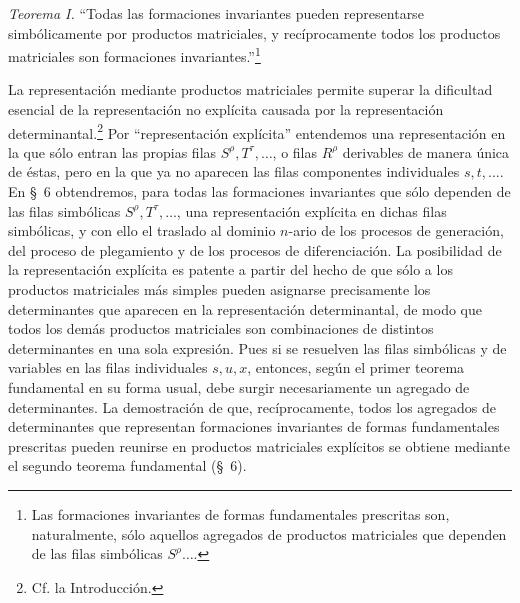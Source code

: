 \documentclass[11pt]{article}
\begin{document}
\emph{Teorema I.} ``Todas las formaciones invariantes pueden representarse simbólicamente por productos matriciales, y recíprocamente todos los productos matriciales son formaciones invariantes.''\footnote{Las formaciones invariantes de formas fundamentales prescritas son, naturalmente, sólo aquellos agregados de productos matriciales que dependen de las filas simbólicas $S^\rho\ldots$.}

La representación mediante productos matriciales permite superar la dificultad esencial de la representación no explícita causada por la representación determinantal.\footnote{Cf. la Introducción.} Por ``representación explícita'' entendemos una representación en la que sólo entran las propias filas $S^\rho,T^\tau,\ldots$, o filas $R^\rho$ derivables de manera única de éstas, pero en la que ya no aparecen las filas componentes individuales $s,t,\ldots$. En \S\ 6 obtendremos, para todas las formaciones invariantes que sólo dependen de las filas simbólicas $S^\rho,T^\tau,\ldots$, una representación explícita en dichas filas simbólicas, y con ello el traslado al dominio $n$-ario de los procesos de generación, del proceso de plegamiento y de los procesos de diferenciación. La posibilidad de la representación explícita es patente a partir del hecho de que sólo a los productos matriciales más simples pueden asignarse precisamente los determinantes que aparecen en la representación determinantal, de modo que todos los demás productos matriciales son combinaciones de distintos determinantes en una sola expresión. Pues si se resuelven las filas simbólicas y de variables en las filas individuales $s,u,x$, entonces, según el primer teorema fundamental en su forma usual, debe surgir necesariamente un agregado de determinantes. La demostración de que, recíprocamente, todos los agregados de determinantes que representan formaciones invariantes de formas fundamentales prescritas pueden reunirse en productos matriciales explícitos se obtiene mediante el segundo teorema fundamental (\S\ 6).
\end{document}
